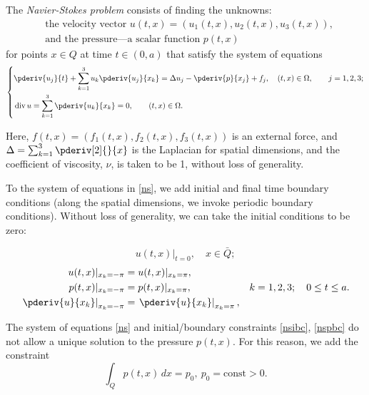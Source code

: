 \documentclass{article}
\DeclareMathOperator{\divr}{div}
\numberwithin{equation}{section}
\begin{document}
The \emph{Navier-Stokes problem} consists of finding the unknowns:
\begin{align*}
&\text{the velocity vector } u(t,x) = (u_1(t,x), u_2(t,x), u_3(t,x)),\\
&\text{and the pressure---a scalar function } p(t,x)
\end{align*}
for points $x \in Q$ at time $t \in (0, a)$ that satisfy the system of
equations
\begin{equation}\label{ns}
    \left\{
    \begin{aligned}
        &\pderiv{u_j}{t} + \sum_{k=1}^{3} u_k \pderiv{u_j}{x_k} = \Delta u_j -
        \pderiv{p}{x_j} + f_j, \quad (t,x) \in \Omega, \qquad j = 1,2,3;\\
       &\divr u \equiv \sum_{k=1}^{3} \pderiv{u_k}{x_k} = 0,\qquad (t,x) \in \Omega.
    \end{aligned}
    \right.
\end{equation}

Here, $f(t,x) = (f_1(t,x), f_2(t,x), f_3(t,x))$ is an external force, and 
$\Delta = \sum_{k=1}^{3} \pderiv[2]{}{x}$ is the Laplacian for spatial
dimensions, and the coefficient of viscosity, $\nu$, is taken to be 1, without
loss of generality.

To the system of equations in \eqref{ns}, we add initial and final time
boundary conditions (along the spatial dimensions, we invoke periodic boundary
conditions).  Without loss of generality, we can take the initial conditions
to be zero:

\begin{equation}
    u(t,x)\rvert_{t=0}, \quad x\in \bar{Q};
    \label{nsibc}
\end{equation}
\begin{align}
    u(t,x)\rvert_{x_k=-\pi} &= u(t,x)\rvert_{x_k = \pi},\nonumber\\
    p(t,x)\rvert_{x_k=-\pi} &= p(t,x)\rvert_{x_k = \pi},
    &k=1,2,3; \quad 0\leq t \leq a. \label{nspbc} \\
    \left.\pderiv{u}{x_k}\right\rvert_{x_k=-\pi} &=
    \left.\pderiv{u}{x_k}\right\rvert_{x_k = \pi},\nonumber
\end{align}

The system of equations \eqref{ns} and initial/boundary constraints
\eqref{nsibc}, \eqref{nspbc} do not allow a unique solution to the pressure
$p(t,x)$. For this reason, we add the constraint
\begin{equation}
    \int_Q p(t,x)\,dx = p_0,\ p_0 = \text{const} > 0.
    \label{nspc}
\end{equation}
\end{document}
